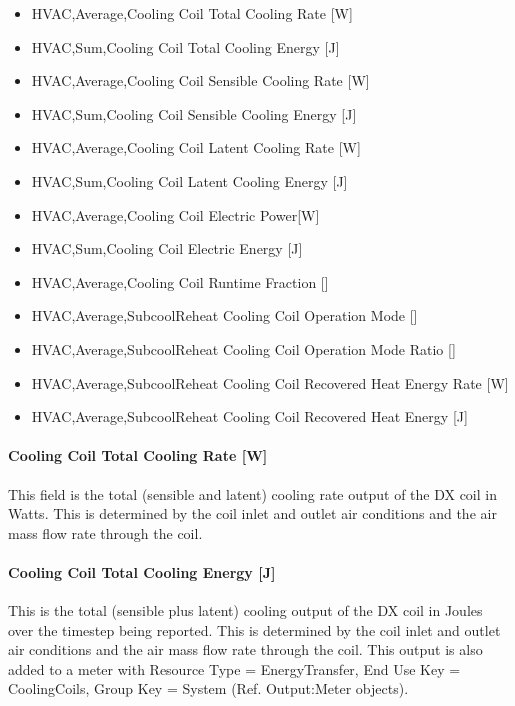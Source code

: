 \begin{itemize}
\item
  HVAC,Average,Cooling Coil Total Cooling Rate {[}W{]}
\item
  HVAC,Sum,Cooling Coil Total Cooling Energy {[}J{]}
\item
  HVAC,Average,Cooling Coil Sensible Cooling Rate {[}W{]}
\item
  HVAC,Sum,Cooling Coil Sensible Cooling Energy {[}J{]}
\item
  HVAC,Average,Cooling Coil Latent Cooling Rate {[}W{]}
\item
  HVAC,Sum,Cooling Coil Latent Cooling Energy {[}J{]}
\item
  HVAC,Average,Cooling Coil Electric Power{[}W{]}
\item
  HVAC,Sum,Cooling Coil Electric Energy {[}J{]}
\item
  HVAC,Average,Cooling Coil Runtime Fraction {[]}
\item
  HVAC,Average,SubcoolReheat Cooling Coil Operation Mode {[]}
\item
  HVAC,Average,SubcoolReheat Cooling Coil Operation Mode Ratio {[]}
\item
  HVAC,Average,SubcoolReheat Cooling Coil Recovered Heat Energy Rate {[}W{]}
\item
  HVAC,Average,SubcoolReheat Cooling Coil Recovered Heat Energy {[}J{]}
\end{itemize}

\paragraph{Cooling Coil Total Cooling Rate {[}W{]}}

This field is the total (sensible and latent) cooling rate output of the DX coil in Watts. This is determined by the coil inlet and outlet air conditions and the air mass flow rate through the coil.

\paragraph{Cooling Coil Total Cooling Energy {[}J{]}}

This is the total (sensible plus latent) cooling output of the DX coil in Joules over the timestep being reported. This is determined by the coil inlet and outlet air conditions and the air mass flow rate through the coil. This output is also added to a meter with Resource Type = EnergyTransfer, End Use Key = CoolingCoils, Group Key = System (Ref. Output:Meter objects).

